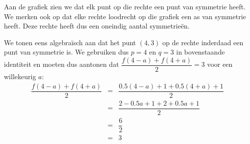\documentclass[12pt,twoside]{article}
\begin{document}
\begin{theorie}
Aan de grafiek zien we dat elk punt op die rechte een punt van symmetrie heeft. We merken ook op dat elke rechte loodrecht op die grafiek een as van symmetrie heeft. Deze rechte heeft dus een oneindig aantal symmetrieën.

We tonen eens algebraïsch aan dat het punt $(4,3)$ op de rechte inderdaad een punt van symmetrie is. We gebruiken dus $p=4$ en $q=3$ in bovenstaande identiteit en moeten dus aantonen dat $\dfrac{f(4-a)+f(4+a)}{2}=3$ voor een willekeurig $a$:
\begin{eqnarray*}
  \dfrac{f(4-a)+f(4+a)}{2} &=& \dfrac{0.5(4-a)+1 + 0.5(4+a)+1}{2}\\
                           &=& \dfrac{2-0.5a + 1 + 2+0.5a + 1}{2}\\
                           &=& \dfrac{6}{2}\\
                           &=& 3
\end{eqnarray*}

\end{theorie}
\end{document}
